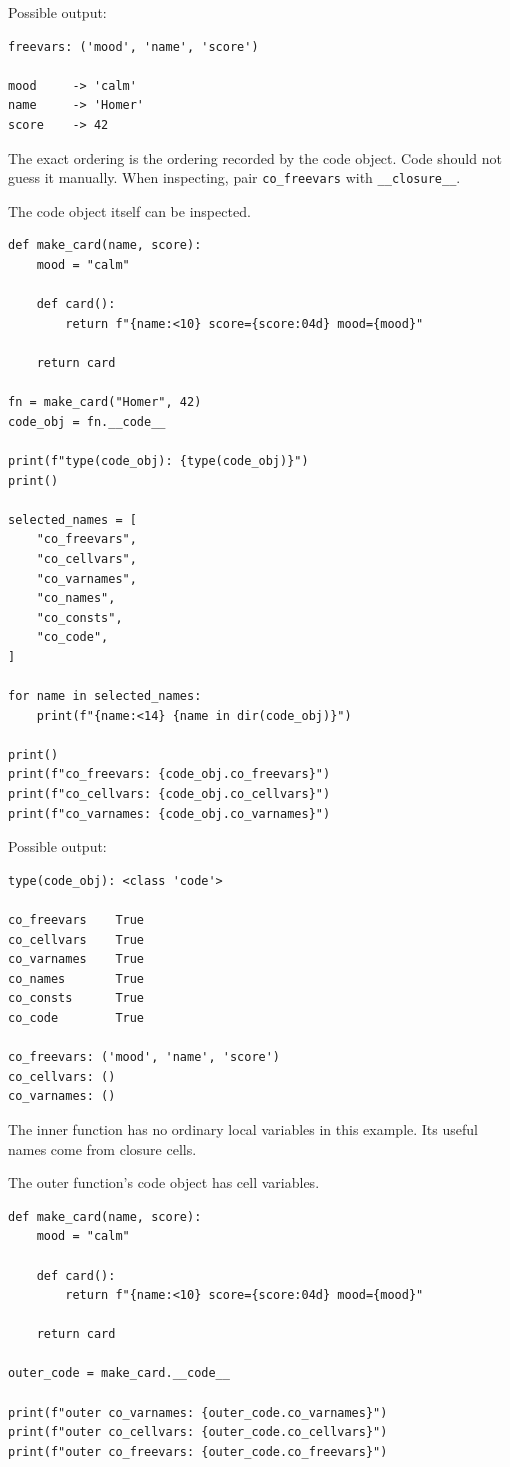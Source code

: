 Possible output:

\begin{verbatim}
freevars: ('mood', 'name', 'score')

mood     -> 'calm'
name     -> 'Homer'
score    -> 42
\end{verbatim}

The exact ordering is the ordering recorded by the code object. Code should not guess it manually. When inspecting, pair \texttt{co\_freevars} with \texttt{\_\_closure\_\_}.

The code object itself can be inspected.

\begin{verbatim}
def make_card(name, score):
    mood = "calm"

    def card():
        return f"{name:<10} score={score:04d} mood={mood}"

    return card

fn = make_card("Homer", 42)
code_obj = fn.__code__

print(f"type(code_obj): {type(code_obj)}")
print()

selected_names = [
    "co_freevars",
    "co_cellvars",
    "co_varnames",
    "co_names",
    "co_consts",
    "co_code",
]

for name in selected_names:
    print(f"{name:<14} {name in dir(code_obj)}")

print()
print(f"co_freevars: {code_obj.co_freevars}")
print(f"co_cellvars: {code_obj.co_cellvars}")
print(f"co_varnames: {code_obj.co_varnames}")
\end{verbatim}

Possible output:

\begin{verbatim}
type(code_obj): <class 'code'>

co_freevars    True
co_cellvars    True
co_varnames    True
co_names       True
co_consts      True
co_code        True

co_freevars: ('mood', 'name', 'score')
co_cellvars: ()
co_varnames: ()
\end{verbatim}

The inner function has no ordinary local variables in this example. Its useful names come from closure cells.

The outer function's code object has cell variables.

\begin{verbatim}
def make_card(name, score):
    mood = "calm"

    def card():
        return f"{name:<10} score={score:04d} mood={mood}"

    return card

outer_code = make_card.__code__

print(f"outer co_varnames: {outer_code.co_varnames}")
print(f"outer co_cellvars: {outer_code.co_cellvars}")
print(f"outer co_freevars: {outer_code.co_freevars}")
\end{verbatim}

